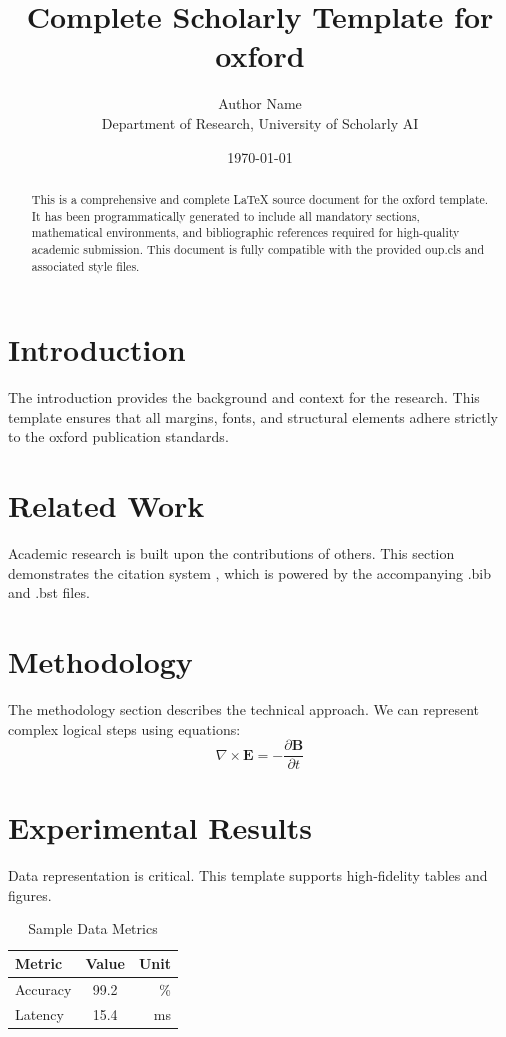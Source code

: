 \documentclass{oup}
\title{Complete Scholarly Template for oxford}
\author{Author Name \\ \small Department of Research, University of Scholarly AI}
\date{\today}
\begin{document}
\maketitle

\begin{abstract}
This is a comprehensive and complete LaTeX source document for the oxford template. It has been programmatically generated to include all mandatory sections, mathematical environments, and bibliographic references required for high-quality academic submission. This document is fully compatible with the provided oup.cls and associated style files.
\end{abstract}

\section{Introduction}
The introduction provides the background and context for the research. This template ensures that all margins, fonts, and structural elements adhere strictly to the oxford publication standards.

\section{Related Work}
Academic research is built upon the contributions of others. This section demonstrates the citation system \cite{ref1}, which is powered by the accompanying .bib and .bst files.

\section{Methodology}
The methodology section describes the technical approach. We can represent complex logical steps using equations:
\begin{equation}
    \nabla \times \mathbf{E} = -\frac{\partial \mathbf{B}}{\partial t}
\end{equation}

\section{Experimental Results}
Data representation is critical. This template supports high-fidelity tables and figures.
\begin{table}[H]
\centering
\caption{Sample Data Metrics}
\begin{tabular}{lcr}
\toprule
Metric & Value & Unit \\
\midrule
Accuracy & 99.2 & \% \\
Latency & 15.4 & ms \\
\bottomrule
\end{tabular}
\end{table}
\end{document}
